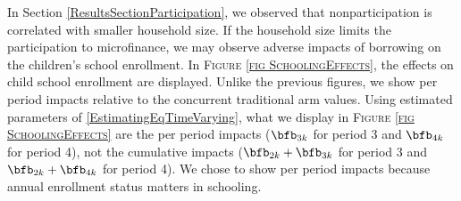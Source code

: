 \begin{figure}
\hfil{}
\end{figure}

	In Section \ref{ResultsSectionParticipation}, we observed that nonparticipation is correlated with smaller household size. If the household size limits the participation to microfinance, we may observe adverse impacts of borrowing on the children's school enrollment. In \textsc{\footnotesize Figure \ref{fig SchoolingEffects}}, the effects on child school enrollment are displayed. Unlike the previous figures, we show per period impacts relative to the concurrent \textsf{traditional} arm values. Using estimated parameters of \eqref{EstimatingEqTimeVarying}, what we display in \textsc{\footnotesize Figure \ref{fig SchoolingEffects}} are the per period impacts ($\bfb_{3k}$ for period 3 and $\bfb_{4k}$ for period 4), not the cumulative impacts ($\bfb_{2k}+\bfb_{3k}$ for period 3 and $\bfb_{2k}+\bfb_{4k}$ for period 4). We chose to show per period impacts because annual enrollment status matters in schooling. 
	
